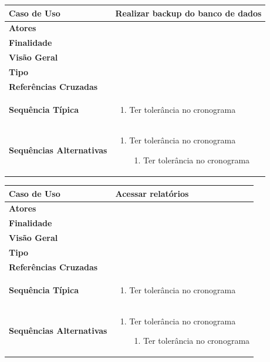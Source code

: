 \documentclass[a4paper,11pt]{article}
\begin{document}
\begin{table}[H]
		\begin{tabularx}{\textwidth}{|l|X|}
		\hline
			\textbf{Caso de Uso} &  Realizar backup do banco de dados \\ \hline
			\textbf{Atores} &    \\ \hline
			\textbf{Finalidade} &   \\ \hline
			\textbf{Visão Geral} &  \\ \hline
			\textbf{Tipo} &  \\ \hline
			\textbf{Referências Cruzadas} &  \\ \hline
			\textbf{Sequência Típica} & 
			\begin{enumerate}
			\item Ter tolerância no cronograma
			\end{enumerate} \\ \hline
			\textbf{Sequências Alternativas} & 
			\begin{enumerate}
			\item Ter tolerância no cronograma
			\begin{enumerate}
			\item Ter tolerância no cronograma
			\end{enumerate}
			\end{enumerate} \\ \hline
		\end{tabularx}
\end{table}

\begin{table}[H]
		\begin{tabularx}{\textwidth}{|l|X|}
		\hline
			\textbf{Caso de Uso} &  Acessar relatórios \\ \hline
			\textbf{Atores} &    \\ \hline
			\textbf{Finalidade} &   \\ \hline
			\textbf{Visão Geral} &  \\ \hline
			\textbf{Tipo} &  \\ \hline
			\textbf{Referências Cruzadas} &  \\ \hline
			\textbf{Sequência Típica} & 
			\begin{enumerate}
			\item Ter tolerância no cronograma
			\end{enumerate} \\ \hline
			\textbf{Sequências Alternativas} & 
			\begin{enumerate}
			\item Ter tolerância no cronograma
			\begin{enumerate}
			\item Ter tolerância no cronograma
			\end{enumerate}
			\end{enumerate} \\ \hline
		\end{tabularx}
\end{table}
\end{document}
